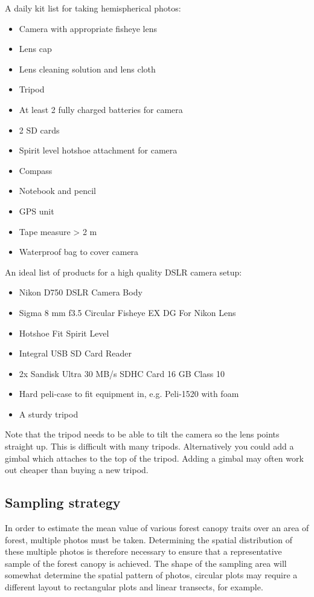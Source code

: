 \documentclass{article}
\begin{document}
A daily kit list for taking hemispherical photos:

\begin{itemize}
	\item{Camera with appropriate fisheye lens}
	\item{Lens cap}
	\item{Lens cleaning solution and lens cloth}
	\item{Tripod}
	\item{At least 2 fully charged batteries for camera}
	\item{2 SD cards}
	\item{Spirit level hotshoe attachment for camera}
	\item{Compass}
	\item{Notebook and pencil}
	\item{GPS unit}
	\item{Tape measure > 2 m}
	\item{Waterproof bag to cover camera}
\end{itemize}

An ideal list of products for a high quality DSLR camera setup:

\begin{itemize}
	\item{Nikon D750 DSLR Camera Body}
	\item{Sigma 8 mm f3.5 Circular Fisheye EX DG For Nikon Lens}
	\item{Hotshoe Fit Spirit Level}
	\item{Integral USB SD Card Reader}
	\item{2x Sandisk Ultra 30 MB/s SDHC Card 16 GB Class 10}
	\item{Hard peli-case to fit equipment in, e.g. Peli-1520 with foam}
	\item{A sturdy tripod}
\end{itemize}

Note that the tripod needs to be able to tilt the camera so the lens points straight up. This is difficult with many tripods. Alternatively you could add a gimbal which attaches to the top of the tripod. Adding a gimbal may often work out cheaper than buying a new tripod.

\subsection{Sampling strategy}

In order to estimate the mean value of various forest canopy traits over an area of forest, multiple photos must be taken. Determining the spatial distribution of these multiple photos is therefore necessary to ensure that a representative sample of the forest canopy is achieved. The shape of the sampling area will somewhat determine the spatial pattern of photos, circular plots may require a different layout to rectangular plots and linear transects, for example.
\end{document}
